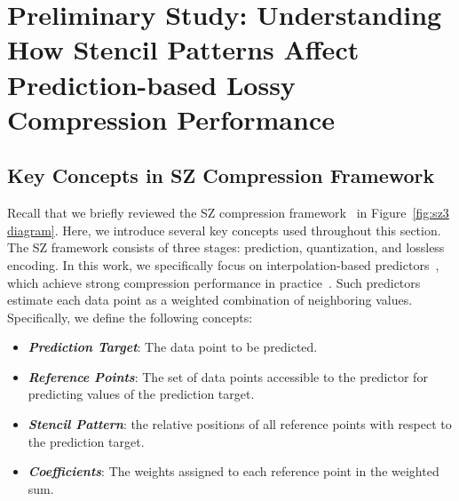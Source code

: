 \section{Preliminary Study: Understanding How Stencil Patterns Affect Prediction-based Lossy Compression Performance}\label{sec:preliminary study}


\subsection{Key Concepts in SZ Compression Framework}



Recall that we briefly reviewed the SZ compression framework~\cite{liang2022sz3} in Figure~\ref{fig:sz3 diagram}. 
Here, we introduce several key concepts used throughout this section.
The SZ framework consists of three stages: prediction, quantization, and lossless encoding. 
In this work, we specifically focus on interpolation-based predictors~\cite{zhao2021optimizing}, which achieve strong compression performance in practice~\cite{liu2022dynamic,liu2024high}. 
Such predictors estimate each data point as a weighted combination of neighboring values.
Specifically, we define the following concepts:

\begin{itemize}
\item \textbf{\textit{Prediction Target}}: The data point to be predicted.
\item \textbf{\textit{Reference Points}}: The set of data points accessible to the predictor for predicting values of the prediction target.
\item \textbf{\textit{Stencil Pattern}}: the relative positions of all reference points with respect to the prediction target.
\item \textbf{\textit{Coefficients}}: The weights assigned to each reference point in the weighted sum.
\end{itemize}

